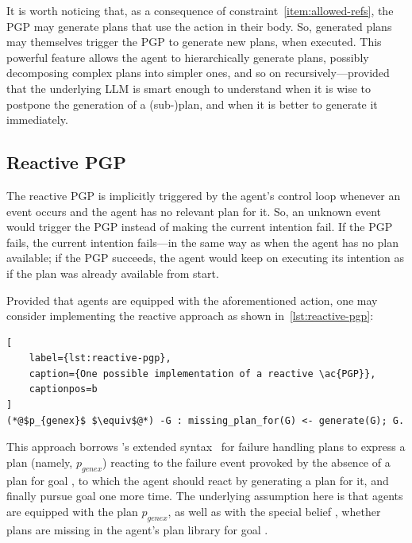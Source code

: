 \documentclass[12pt,a4paper,openright,twoside]{book}
\begin{document}
It is worth noticing that, as a consequence of constraint~\ref{item:allowed-refs}, the \ac{PGP} may generate plans that use the  action in their body.
%
So, generated plans may themselves trigger the \ac{PGP} to generate new plans, when executed.
%
This powerful feature allows the agent to hierarchically generate plans, possibly decomposing complex plans into simpler ones, and so on recursively---provided that the underlying \ac{LLM} is smart enough to understand when it is wise to postpone the generation of a (sub-)plan, and when it is better to generate it immediately.

\subsection{Reactive PGP}\label{sec:reactive-pgp}

The reactive \ac{PGP} is implicitly triggered by the agent's control loop whenever an event  occurs and the agent has no relevant plan for it.
%
So, an unknown event would trigger the \ac{PGP} instead of making the current intention fail.
%
If the \ac{PGP} fails, the current intention fails---in the same way as when the agent has no plan available; if the \ac{PGP} succeeds, the agent would keep on executing its intention as if the plan was already available from start.


Provided that agents are equipped with the aforementioned  action, one may consider implementing the reactive approach as shown in~\cref{lst:reactive-pgp}:
%
\begin{lstlisting}[
    label={lst:reactive-pgp},
    caption={One possible implementation of a reactive \ac{PGP}},
    captionpos=b
]
(*@$p_{genex}$ $\equiv$@*) -G : missing_plan_for(G) <- generate(G); G.
\end{lstlisting}
%
This approach borrows \jason{}'s extended \agentspeak{} syntax~\cite{BordiniHW2007} for failure handling plans\footnotemark{} to express a plan (namely, $p_{genex}$) reacting to the failure event provoked by the absence of a plan for goal , to which the agent should react by generating a plan for it, and finally pursue goal  one more time.
%
The underlying assumption here is that agents are equipped with the plan $p_{genex}$, as well as with the special belief , whether plans are missing in the agent's plan library for goal .
%
\end{document}
